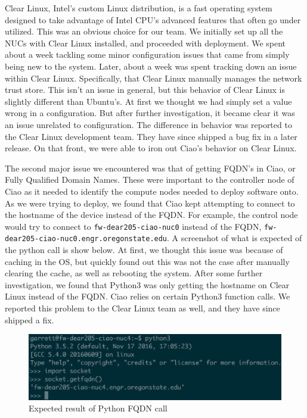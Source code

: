\documentclass[10pt,onecolumn,journal,draftclsnofoot]{IEEEtran}
\begin{document}
Clear Linux, Intel's custom Linux distribution, is a fast operating system
designed to take advantage of Intel CPU's advanced features that often go
under utilized. This was an obvious choice for our team. We initially set up
all the NUCs with Clear Linux installed, and proceeded with deployment.
We spent about a week tackling some minor configuration issues that came from
simply being new to the system. Later, about a week was spent tracking down an
issue within Clear Linux. Specifically, that Clear Linux manually manages the
network trust store. This isn't an issue in general, but this behavior of Clear
Linux is slightly different than Ubuntu's. At first we thought we had simply
set a value wrong in a configuration. But after further investigation, it
became clear it was an issue unrelated to configuration. The difference in 
behavior was reported to the Clear Linux development team. They have since
shipped a bug fix in a later release. On that front, we were able to iron out
Ciao's behavior on Clear Linux.

The second major issue we encountered was that of getting FQDN's in Ciao, or
Fully Qualified Domain Names. These were important to the controller node of
Ciao as it needed to identify the compute nodes needed to deploy software onto.
As we were trying to deploy, we found that Ciao kept attempting to connect to
the hostname of the device instead of the FQDN. For example, the control node
would try to connect to \texttt{fw-dear205-ciao-nuc0} instead of the FQDN,
\texttt{fw-dear205-ciao-nuc0.engr.oregonstate.edu}. A screenshot of what is
expected of the python call is show below. At first, we thought this issue was
because of caching in the OS, but quickly found out this was not the case after
manually clearing the cache, as well as rebooting the system.  After some
further investigation, we found that Python3 was only getting the hostname on
Clear Linux instead of the FQDN. Ciao relies on certain Python3 function calls.
We reported this problem to the Clear Linux team as well, and they have since
shipped a fix. 

\begin{figure}[h]
	\caption{Expected result of Python FQDN call}
	\centering
	\includegraphics[scale=0.5]{getfqdn.eps}
\end{figure}
\end{document}
